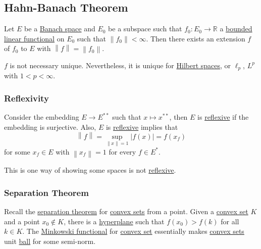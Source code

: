 \subsection{Hahn-Banach Theorem}
Let \(E\) be a \hyperref[def:Banach-space]{Banach space} and \(E_0\) be a subspace such that \(f_0 \colon E_0 \to \mathbb{R} \) a \hyperref[def:bounded-linear-functional]{bounded linear functional} on \(E_0\) such that \(\left\lVert f_0\right\rVert < \infty \). Then there exists an extension \(f\) of \(f_0\) to \(E\) with \(\left\lVert f\right\rVert = \left\lVert f_0\right\rVert \).

\begin{remark}
	\(f\) is not necessary unique. Nevertheless, it is unique for \hyperref[def:Hilbert-space]{Hilbert spaces}, or \(\ell _p\), \(L^p\) with \(1 < p < \infty \).
\end{remark}

\subsubsection{Reflexivity}
Consider the embedding \(E\to E^{\ast\ast} \) such that \(x\mapsto x^{\ast\ast}\), then \(E\) is \hyperref[def:reflexive-space]{reflexive} if the embedding is surjective. Also, \(E\) is \hyperref[def:reflexive-space]{reflexive} implies that
\[
	\left\lVert f\right\rVert = \sup _{\left\lVert x\right\rVert = 1}\left\vert f(x) \right\vert = f(x_f)
\]
for some \(x_f\in E\) with \(\left\lVert x_f\right\rVert = 1\) for every \(f\in E^{\ast} \).

\begin{remark}
	This is one way of showing some spaces is not \hyperref[def:reflexive-space]{reflexive}.
\end{remark}

\subsubsection{Separation Theorem}
Recall the \hyperref[thm:separation-of-a-point-from-a-convex-set]{separation theorem} for \hyperref[def:convex-set]{convex sets} from a point. Given a \hyperref[def:convex-set]{convex set} \(K\) and a point \(x_0 \notin K\), there is a \hyperref[def:hyperplane]{hyperplane} such that \(f(x_0) > f(k)\) for all \(k\in K\). The \hyperref[def:Minkowski-functional]{Minkowski functional} for \hyperref[def:convex-set]{convex set} essentially makes \hyperref[def:convex-set]{convex sets} unit \hyperref[def:ball]{ball} for some semi-norm.